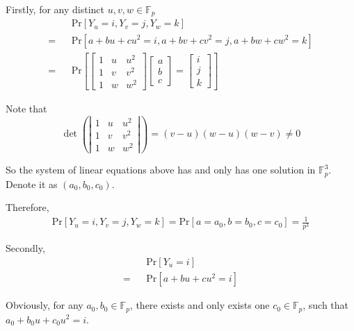 		\item
		
			Firstly, for any distinct $u, v, w \in \mathbb{F}_{p}$
			\begin{eqnarray*}
				&&\text{Pr}[Y_u = i, Y_v = j, Y_w = k] \\
				= &&\text{Pr}[a + bu + cu^2 = i, a + bv + cv^2 = j, a + bw + cw^2 = k] \\
				= &&\text{Pr}[
				\left[
				\begin{matrix}
					1 & u & u^2 \\
					1 & v & v^2 \\
					1 & w & w^2
				\end{matrix}
				\right]
				\left[
				\begin{matrix}
					a \\
					b \\
					c
				\end{matrix}
				\right]
				=
				\left[
				\begin{matrix}
					i \\
					j \\
					k
				\end{matrix}
				\right]
				]
			\end{eqnarray*}
			
			Note that
			\[
				\det
				\left(\left|
				\begin{matrix}
					1 & u & u^2 \\
					1 & v & v^2 \\
					1 & w & w^2
				\end{matrix}
				\right|\right)
				=
				(v - u)(w - u)(w - v)
				\neq
				0
			\]
			
			So the system of linear equations above has and only has one solution in $\mathbb{F}^{3}_{p}$.
			Denote it as $(a_0, b_0, c_0)$.
			
			Therefore,
			\begin{eqnarray*}
				\text{Pr}[Y_u = i, Y_v = j, Y_w = k]
				= \text{Pr}[a = a_0, b = b_0, c = c_0]
				= \frac{1}{p^3}
			\end{eqnarray*}
			
			Secondly,
			\begin{eqnarray*}
				&&\text{Pr}[Y_u = i] \\
				= &&\text{Pr}[a + bu + cu^2 = i]
			\end{eqnarray*}
			
			Obviously, for any $a_0, b_0 \in \mathbb{F}_{p}$, there exists and only exists one $c_0 \in \mathbb{F}_{p}$, such that $a_0 + b_0 u + c_0 u^2 = i$.
			
